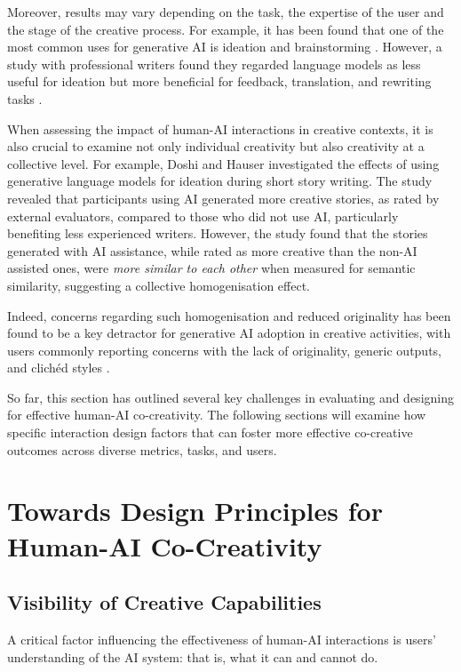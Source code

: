 Moreover, results may vary depending on the task, the expertise of the user and the stage of the creative process. For example, it has been found that one of the most common uses for generative AI is ideation and brainstorming \cite{Zao-Sanders2024-qo}. However, a study with professional writers found they regarded language models as less useful for ideation but more beneficial for feedback, translation, and rewriting tasks \cite{Chakrabarty2024-ov}.

When assessing the impact of human-AI interactions in creative contexts, it is also crucial to examine not only individual creativity but also creativity at a collective level. For example, Doshi and Hauser \cite{Doshi2023-dv} investigated the effects of using generative language models for ideation during short story writing. The study revealed that participants using AI generated more creative stories, as rated by external evaluators, compared to those who did not use AI, particularly benefiting less experienced writers. However, the study found that the stories generated with AI assistance, while rated as more creative than the non-AI assisted ones, were \textit{more similar to each other} when measured for semantic similarity, suggesting a collective homogenisation effect.

Indeed, concerns regarding such homogenisation and reduced originality has been found to be a key detractor for generative AI adoption in creative activities, with users commonly reporting concerns with the lack of originality, generic outputs, and clichéd styles \cite{Chakrabarty2024-ov, Chang2023-tv, Clark1998-yi, Ippolito2022-mf, Li2024-yh}.

So far, this section has outlined several key challenges in evaluating and designing for effective human-AI co-creativity. The following sections will examine how specific interaction design factors that can foster more effective co-creative outcomes across diverse metrics, tasks, and users. 

\section{Towards Design Principles for Human-AI Co-Creativity}

\subsection{Visibility of Creative Capabilities}

A critical factor influencing the effectiveness of human-AI interactions is users' understanding of the AI system: that is, what it can and cannot do.

